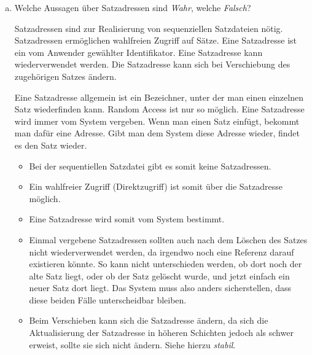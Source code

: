 \begin{enumerate}[a)]
	\item Welche Aussagen über Satzadressen sind \textit{Wahr}, welche \textit{Falsch}?

    \begin{description}
        \itemmc    Satzadressen sind zur Realisierung von sequenziellen Satzdateien nötig.
        \itemmcsol Satzadressen ermöglichen wahlfreien Zugriff auf Sätze.
        \itemmc    Eine Satzadresse ist ein vom Anwender gewählter Identifikator.
        \itemmcsol Eine Satzadresse kann wiederverwendet werden.
        \itemmcsol Die Satzadresse kann sich bei Verschiebung des zugehörigen Satzes ändern.
    \end{description}

	\begin{solution}
	Eine Satzadresse allgemein ist ein Bezeichner, unter der man einen einzelnen Satz wiederfinden kann. Random Access ist nur so möglich. Eine Satzadresse wird immer vom System vergeben. Wenn man einen Satz einfügt, bekommt man dafür eine Adresse. Gibt man dem System diese Adresse wieder, findet es den Satz wieder.
	
	\begin{itemize}
		\item Bei der sequentiellen Satzdatei gibt es somit keine Satzadressen.
		\item Ein wahlfreier Zugriff (Direktzugriff) ist somit über die Satzadresse möglich.
		\item Eine Satzadresse wird somit vom System bestimmt.
		\item Einmal vergebene Satzadressen sollten auch nach dem Löschen des Satzes nicht wiederverwendet werden, da irgendwo noch eine Referenz darauf existieren könnte. So kann nicht unterschieden werden, ob dort noch der alte Satz liegt, oder ob der Satz gelöscht wurde, und jetzt einfach ein neuer Satz dort liegt.
			Das System muss also anders sicherstellen, dass diese beiden Fälle unterscheidbar bleiben.
		\item Beim Verschieben kann sich die Satzadresse ändern, da sich die Aktualisierung der Satzadresse in höheren Schichten jedoch als schwer erweist, sollte sie sich nicht ändern. Siehe hierzu \textit{stabil}.
	\end{itemize}
	\end{solution}
\end{enumerate}



